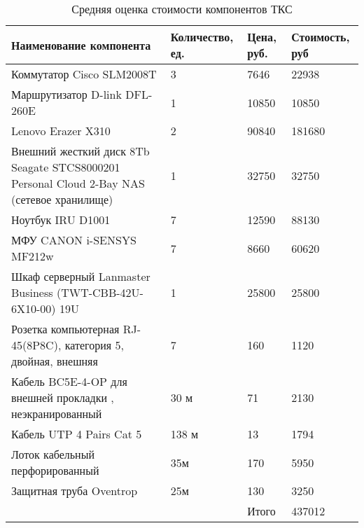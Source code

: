 \begin{table}[H]
  \centering
  \caption{Средняя оценка стоимости компонентов ТКС}
  \begin{tabular}{|p{7cm}|l|l|l|} \hline
    Наименование компонента & Количество, ед. & Цена, руб.& Стоимость, руб \\ \hline
    Коммутатор Cisco SLM2008T & 3 & 7646 & 22938 \\ \hline
    Маршрутизатор D-link DFL-260E & 1 & 10850 & 10850 \\ \hline
    Lenovo Erazer X310 & 2 & 90840 & 181680 \\ \hline
    Внешний жесткий диск 8Tb Seagate STCS8000201 Personal Cloud 2-Bay NAS
(сетевое хранилище) & 1 & 32750 & 32750 \\ \hline
    Ноутбук IRU D1001 & 7 & 12590 & 88130 \\ \hline
    МФУ CANON i-SENSYS MF212w & 7 & 8660 & 60620 \\ \hline
    Шкаф серверный Lanmaster Business (TWT-CBB-42U-6X10-00) 19U & 1 & 25800 & 25800 \\ \hline
    Розетка компьютерная RJ-45(8P8C), категория 5, двойная, внешняя & 7 & 160 & 1120 \\ \hline
    Кабель BC5E-4-OP для внешней прокладки , неэкранированный & 30 м & 71 & 2130 \\ \hline
    Кабель UTP 4 Pairs Cat 5 & 138 м & 13 & 1794 \\ \hline
    Лоток кабельный перфорированный & 35м & 170 & 5950 \\ \hline
    Защитная труба Oventrop & 25м & 130 & 3250 \\ \hline
    & & Итого & 437012 \\ \hline
  \end{tabular}
  \label{tab:estm}
\end{table}

